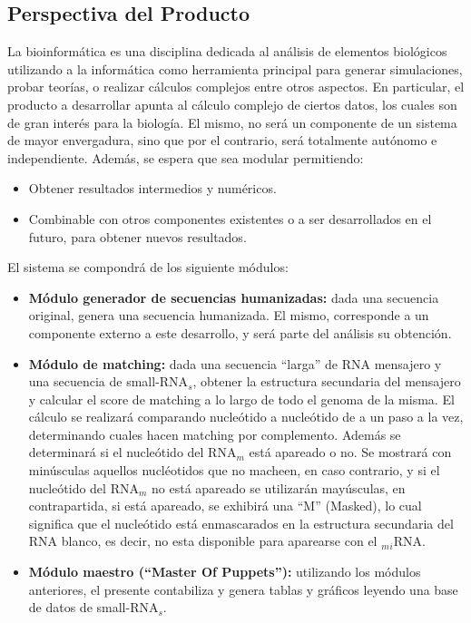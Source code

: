 \documentclass[12pt,a4paper,spanish]{article}
\begin{document}
\subsection{Perspectiva del Producto}
\par La bioinformática es una disciplina dedicada al análisis de elementos biológicos utilizando a la informática como herramienta principal para generar simulaciones, probar teorías, o realizar cálculos complejos entre otros aspectos. En particular, el producto a desarrollar apunta al cálculo complejo de ciertos datos, los cuales son de gran interés para la biología. El mismo, no será un componente de un sistema de mayor envergadura, sino que por el contrario, será totalmente autónomo e independiente. Además, se espera que sea modular permitiendo:
	\begin{itemize} 
		\item Obtener resultados intermedios y numéricos.
		\item Combinable con otros componentes existentes o a ser desarrollados en el futuro, para obtener nuevos resultados.
	\end{itemize}
\par El sistema se compondrá de los siguiente módulos:
	\begin{itemize}
		\item \textbf{Módulo generador de secuencias humanizadas:} dada una secuencia original, genera una secuencia humanizada. El mismo, corresponde a un componente externo a este desarrollo, y será parte del análisis su obtención.

		\item \textbf{Módulo de matching:} dada una secuencia “larga” de RNA mensajero y una secuencia de small-RNA$_s$, 			obtener la estructura secundaria del mensajero y calcular el score de matching a lo largo de todo el genoma de la 			misma. El cálculo se realizará comparando nucleótido a nucleótido de a un paso a la vez, determinando cuales hacen 			matching por complemento. Además se determinará si el nucleótido del RNA$_m$ está apareado o no.
		Se mostrará con minúsculas aquellos nucléotidos que no macheen, en caso contrario, y si el nucleótido del RNA$_m$ 			no está apareado se utilizarán mayúsculas, en contrapartida, si está apareado, se exhibirá una ``M'' (Masked), lo 			cual significa que el nucleótido está enmascarados en la estructura secundaria del RNA blanco, es decir, no esta 			disponible para aparearse con el $_m$$_i$RNA.


		\item \textbf{Módulo maestro (“Master Of Puppets”):} utilizando los módulos anteriores, el presente contabiliza y genera tablas y gráficos leyendo una base de datos de small-RNA$_s$. 
	\end{itemize}
\end{document}

